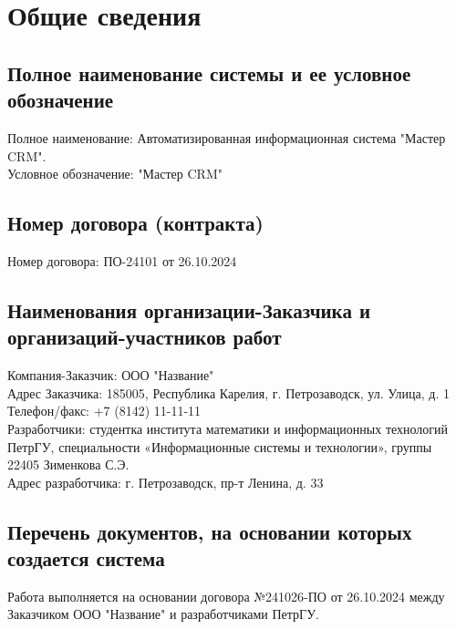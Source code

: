 \documentclass[russian, utf8, 12pt,pointsubsection,floatsubsection]{eskdtext}
\begin{document}
\maketitle 

\scriptsize
\setcounter{tocdepth}{4}
\tableofcontents
\normalsize
\newpage


\section{Общие сведения}

\subsection{Полное наименование системы и ее условное обозначение}
Полное наименование: Автоматизированная информационная система "Мастер CRM".\\

Условное обозначение: "Мастер CRM"

\subsection{Номер договора (контракта)}
Номер договора: \No ПО-24101 от 26.10.2024

\subsection{Наименования организации-Заказчика и организаций-участников работ}
Компания-Заказчик: ООО "Название"\\

Адрес Заказчика: 185005, Республика Карелия, г. Петрозаводск, ул. Улица, д. 1\\
Телефон/факс: +7 (8142) 11-11-11\\


Разработчики: студентка института математики и информационных технологий ПетрГУ, специальности «Информационные системы и технологии», группы 22405 Зименкова С.Э.\\

Адрес разработчика: г. Петрозаводск, пр-т Ленина, д. 33

\subsection{Перечень документов, на основании которых создается система}
Работа выполняется на основании договора №241026-ПО от 26.10.2024 между Заказчиком ООО "Название" и разработчиками ПетрГУ.
\end{document}
